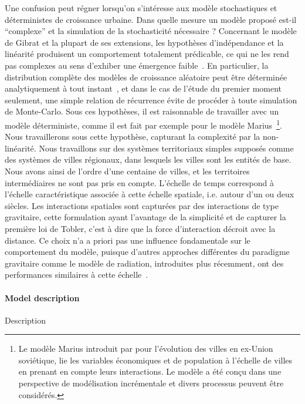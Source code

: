 {Une confusion peut régner lorsqu'on s'intéresse aux modèle stochastiques et déterministes de croissance urbaine. Dans quelle mesure un modèle proposé est-il ``complexe'' et la simulation de la stochasticité nécessaire ?  Concernant le modèle de Gibrat et la plupart de ses extensions, les hypothèses d'indépendance et la linéarité produisent un comportement totalement prédicable, ce qui ne les rend pas complexes au sens d'exhiber une émergence faible~\cite{bedau2002downward}. En particulier, la distribution complète des modèles de croissance aléatoire peut être déterminée analytiquement à tout instant~\cite{gabaix1999zipf}, et dans le cas de l'étude du premier moment seulement, une simple relation de récurrence évite de procéder à toute simulation de Monte-Carlo. Sous ces hypothèses, il est raisonnable de travailler avec un modèle déterministe, comme il est fait par exemple pour le modèle Marius~\cite{cottineau2014evolution}\footnote{Le modèle Marius introduit par \cite{cottineau2014evolution} pour l'évolution des villes en ex-Union soviétique, lie les variables économiques et de population à l'échelle de villes en prenant en compte leurs interactions. Le modèle a été conçu dans une perspective de modélisation incrémentale et divers processus peuvent être considérés.}. Nous travaillerons sous cette hypothèse, capturant la complexité par la non-linéarité. Nous travaillons sur des systèmes territoriaux simples supposés comme des systèmes de villes régionaux, dans lesquels les villes sont les entités de base. Nous avons ainsi de l'ordre d'une centaine de villes, et les territoires intermédiaires ne sont pas pris en compte. L'échelle de temps correspond à l'échelle caractéristique associée à cette échelle spatiale, i.e. autour d'un ou deux siècles. Les interactions spatiales sont capturées par des interactions de type gravitaire, cette formulation ayant l'avantage de la simplicité et de capturer la première loi de Tobler, c'est à dire que la force d'interaction décroit avec la distance. Ce choix n'a a priori pas une influence fondamentale sur le comportement du modèle, puisque d'autres approches différentes du paradigme gravitaire comme le modèle de radiation, introduites plus récemment, ont des performances similaires à cette échelle~\cite{masucci2013gravity}.
}

\paragraph{Model description}{Description}

